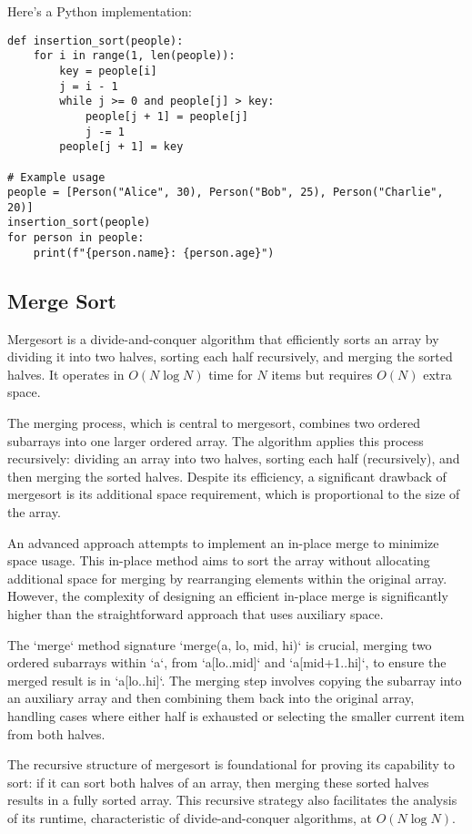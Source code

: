 \documentclass{article}
\begin{document}
Here's a Python implementation:
\begin{verbatim}
def insertion_sort(people):
    for i in range(1, len(people)):
        key = people[i]
        j = i - 1
        while j >= 0 and people[j] > key:
            people[j + 1] = people[j]
            j -= 1
        people[j + 1] = key

# Example usage
people = [Person("Alice", 30), Person("Bob", 25), Person("Charlie", 20)]
insertion_sort(people)
for person in people:
    print(f"{person.name}: {person.age}")
\end{verbatim}

\subsection{Merge Sort  }
Mergesort is a divide-and-conquer algorithm that efficiently sorts an array by dividing it into two halves, sorting each half recursively, and merging the sorted halves. It operates in \(O(N \log N)\) time for \(N\) items but requires \(O(N)\) extra space.

The merging process, which is central to mergesort, combines two ordered subarrays into one larger ordered array. The algorithm applies this process recursively: dividing an array into two halves, sorting each half (recursively), and then merging the sorted halves. Despite its efficiency, a significant drawback of mergesort is its additional space requirement, which is proportional to the size of the array.

An advanced approach attempts to implement an in-place merge to minimize space usage. This in-place method aims to sort the array without allocating additional space for merging by rearranging elements within the original array. However, the complexity of designing an efficient in-place merge is significantly higher than the straightforward approach that uses auxiliary space.

The `merge` method signature `merge(a, lo, mid, hi)` is crucial, merging two ordered subarrays within `a`, from `a[lo..mid]` and `a[mid+1..hi]`, to ensure the merged result is in `a[lo..hi]`. The merging step involves copying the subarray into an auxiliary array and then combining them back into the original array, handling cases where either half is exhausted or selecting the smaller current item from both halves.

The recursive structure of mergesort is foundational for proving its capability to sort: if it can sort both halves of an array, then merging these sorted halves results in a fully sorted array. This recursive strategy also facilitates the analysis of its runtime, characteristic of divide-and-conquer algorithms, at \(O(N \log N)\).
\end{document}
